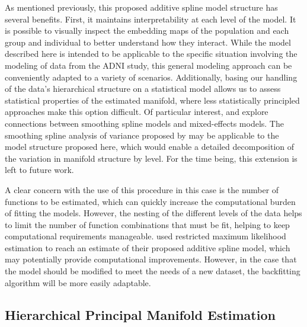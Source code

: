 \documentclass[11pt,reqno]{article}
\theoremstyle{definition}
\begin{document}
As mentioned previously, this proposed additive spline model structure has several benefits. First, it maintains interpretability at each level of the model. It is possible to visually inspect the embedding maps of the population and each group and individual to better understand how they interact. While the model described here is intended to be applicable to the specific situation involving the modeling of data from the ADNI study, this general modeling approach can be conveniently adapted to a variety of scenarios. Additionally, basing our handling of the data's hierarchical structure on a statistical model allows us to assess statistical properties of the estimated manifold, where less statistically principled approaches make this option difficult. Of particular interest, \cite{wangMixedEffectsSmoothing1998} and \cite{brumbackSmoothingSplineModels1998} explore connections between smoothing spline models and mixed-effects models. The smoothing spline analysis of variance proposed by \cite{wangMixedEffectsSmoothing1998} may be applicable to the model structure proposed here, which would enable a detailed decomposition of the variation in manifold structure by level. For the time being, this extension is left to future work.

A clear concern with the use of this procedure in this case is the number of functions to be estimated, which can quickly increase the computational burden of fitting the models. However, the nesting of the different levels of the data helps to limit the number of function combinations that must be fit, helping to keep computational requirements manageable. \cite{brumbackSmoothingSplineModels1998} used restricted maximum likelihood estimation to reach an estimate of their proposed additive spline model, which may potentially provide computational improvements. However, in the case that the model should be modified to meet the needs of a new dataset, the backfitting algorithm will be more easily adaptable. 

\subsection{Hierarchical Principal Manifold Estimation}
\end{document}
